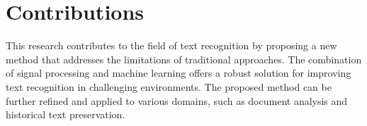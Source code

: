 \documentclass{article}
\begin{document}
\section{Contributions}
This research contributes to the field of text recognition by proposing a new method that addresses the limitations of traditional approaches. The combination of signal processing and machine learning offers a robust solution for improving text recognition in challenging environments. The proposed method can be further refined and applied to various domains, such as document analysis and historical text preservation.



\end{document}
